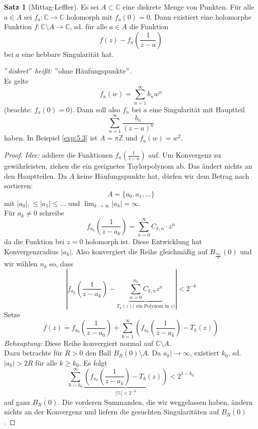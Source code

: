 \documentclass[11pt,titlepage]{article}
\theoremstyle{definition}
\newtheorem{theorem}{Satz}[section]
\theoremstyle{remark}
\begin{document}
	\begin{theorem}[Mittag-Leffler]
		Es sei $A\subset\mathbb{C}$ eine diskrete Menge von Punkten. Für 
		alle $a\in A$ sei $f_a:\mathbb{C}\to\mathbb{C}$ holomorph mit $f_a(0)=0$. Dann existiert eine 
		holomorphe Funktion $f:\mathbb{C}\setminus A\to \mathbb{C}$, sd. für alle $a\in A$ die Funktion
		\[ f(z) -f_a\left(\frac{1}{z-a}\right) \]
		bei $a$ eine hebbare Singularität hat.
	\end{theorem}
	
	\textsl{$"$diskret$"$ heißt:} $"$ohne Häufungspunkte$"$. \\
	Es gelte
	\[ f_a(w)=\sum_{n=1}^{\infty} b_n w^n \]
	(beachte: $f_a(0)=0$). Dann soll also $f_n$ bei $a$ eine Singularität mit Hauptteil
	\[ \sum_{n=1}^{\infty} \frac{b_n}{(z-a)^n} \]
	haben. In Beispiel \ref{exp:5.3} ist $A=\pi\mathbb{Z}$ und $f_a(w)=w^2$.
	
	\begin{proof}
		\textsl{Idee:} addiere die Funktionen $f_a\left(\frac{1}{z-a}\right)$ auf. Um Konvergenz zu gewährleisten, ziehen 
		die ein geeignetes Taylorpolynom ab. Das ändert nichts an den Hauptteilen. Da $A$ keine Häufungspunkte 
		hat, dürfen wir dem Betrag nach sortieren:
		\[ A=\{ a_0,a_1,\ldots\} \]
		mit $|a_0|,\leq|a_1|\leq \ldots$ und $\lim_{k\to\infty}|a_k|=\infty$. \\
		Für $a_k\neq 0$ schreibe
		\[ f_{a_k} \left(\frac{1}{z-a_k}\right) =\sum_{n=0}^{\infty} C_{k,n}\cdot z^n \]
		da die Funktion bei $z=0$ holomorph ist. Diese Entwicklung hat Konvergenzradius $|a_k|$. Also konvergiert 
		die Reihe gleichmäßig auf $B_{\frac{|a_k|}{2}}(0)$ und wir wählen $n_k$ so, dass
		\[ \left| f_{a_k}\left(\frac{1}{z-a_k}\right) -\underbrace{\sum_{n=0}^{n_k} C_{k,n} z^n}_{T_k(z) \text{( ein Polynom 
		in $z$)}}\right| < 2^{-k} \]
		Setze
		\[ f(z)=f_{a_0}\left(\frac{1}{z-a_0}\right) +\sum_{k=1}^{\infty}\left(f_{a_k}\left(\frac{1}{z-a_k}\right) -T_k(z)\right) \]
		\textsl{Behauptung:} Diese Reihe konvergiert normal auf $\mathbb{C}\setminus A$. \\
		Dazu betrachte für $R>0$ den Ball $\overline{B_R(0)}\setminus A$. Da $a_k|\to\infty$, existiert $k_0$, sd. 
		$|a_k|>2R$ für alle $k\geq k_0$. Es folgt 
		\[ \sum_{k=k_0}^{\infty}\underbrace{\left(f_{a_k}\left(\frac{1}{z-a_k}\right)-T_k(z)\right)}_{|\%|<2^{-k}}
		< 2^{1-k_0} \]
		auf ganz $\overline{B_R(0)}$. Die vorderen Summanden, die wir weggelassen haben, ändern nichts 
		an der Konvergenz und liefern die gesuchten Singularitäten auf $\overline{B_R(0)}$.
		
		
		
		
	\end{proof}
	
\end{document}
